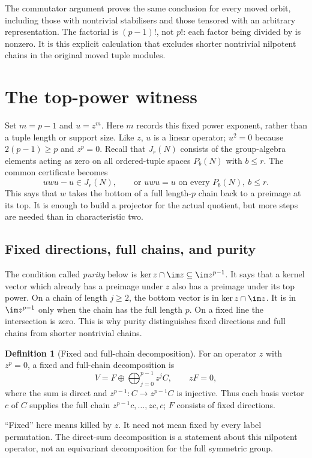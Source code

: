 \documentclass[11pt,a4paper,oneside,openany]{book}
\theoremstyle{definition}\newtheorem{definition}[theorem]{Definition}
\theoremstyle{remark}\newtheorem{remark}[theorem]{Remark}
\numberwithin{equation}{chapter}
\begin{document}
The commutator argument proves the same conclusion for every moved
orbit, including those with nontrivial stabilisers and those tensored
with an arbitrary representation. The factorial is $(p-1)!$, not
$p!$: each factor being divided by is nonzero. It is this explicit
calculation that excludes shorter nontrivial nilpotent chains in
the original moved tuple modules.

\section{The top-power witness}\label{tx:sec:topwitness}
Set $m=p-1$ and $u=z^m$. Here $m$ records this fixed power
exponent, rather than a tuple length or support size. Like $z$, $u$ is a linear operator; $u^2=0$ because
$2(p-1)\ge p$ and $z^p=0$. Recall that $J_r(N)$ consists of the
group-algebra elements acting as zero on all ordered-tuple spaces
$P_b(N)$ with $b\le r$. The common certificate becomes
\begin{equation}\label{tx:eq:topwitness}uwu-u\in J_r(N),\qquad\text{or }uwu=u\text{ on every }P_b(N),\ b\le r.
\end{equation}
This says that $w$ takes the bottom of a full length-$p$ chain back to a preimage at its top. It is enough to build a projector for the actual quotient, but more steps are needed than in characteristic two.

\subsection{Fixed directions, full chains, and purity}
The condition called \emph{purity} below is
$\ker z\cap\im z\subseteq\im z^{p-1}$. It says that a kernel
vector which already has a preimage under $z$ also has a preimage
under its top power. On a chain of length $j\ge2$, the bottom vector
is in $\ker z\cap\im z$. It is in $\im z^{p-1}$ only when the
chain has the full length $p$. On a fixed line the intersection is
zero. This is why purity distinguishes fixed directions and full
chains from shorter nontrivial chains.

\begin{definition}[Fixed and full-chain decomposition]\label{tx:def:full-chains}
For an operator $z$ with $z^p=0$, a fixed and full-chain decomposition is
\[
             V=F\oplus\bigoplus_{j=0}^{p-1}z^jC,
             \qquad zF=0,
\]
where the sum is direct and $z^{p-1}:C\to z^{p-1}C$ is injective.
Thus each basis vector $c$ of $C$ supplies the full chain
$z^{p-1}c,\ldots,zc,c$; $F$ consists of fixed directions.
\end{definition}
``Fixed'' here means killed by $z$. It need not mean fixed by every
label permutation. The direct-sum decomposition is a statement about
this nilpotent operator, not an equivariant decomposition for the
full symmetric group.
\end{document}
